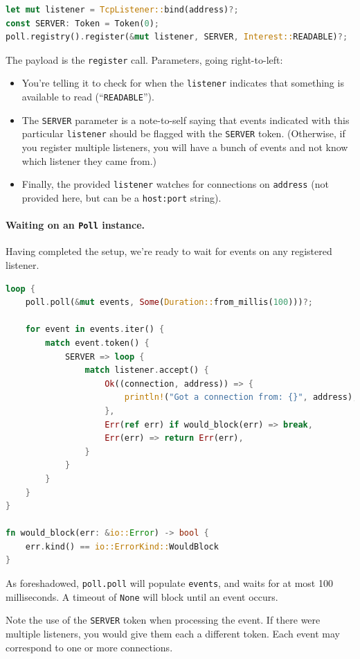 \begin{lstlisting}[language=Rust]
let mut listener = TcpListener::bind(address)?;
const SERVER: Token = Token(0);
poll.registry().register(&mut listener, SERVER, Interest::READABLE)?;
\end{lstlisting}

The payload is the \texttt{register} call. Parameters, going right-to-left:
\begin{itemize}[noitemsep]
\item You're telling it to check for 
when the \texttt{listener} indicates that something is available to read
(``\texttt{READABLE}'').
\item The \texttt{SERVER} parameter
is a note-to-self saying that events indicated with this particular
\texttt{listener} should be flagged with the \texttt{SERVER} token.
(Otherwise, if you register multiple listeners, you will have a bunch
of events and not know which listener they came from.)
\item Finally, the provided
\texttt{listener} watches for connections on \texttt{address} (not provided here,
but can be a \texttt{host:port} string).
\end{itemize}

\paragraph{Waiting on an {\tt Poll} instance.} Having completed
the setup, we're ready to wait for events on any registered listener.
    \begin{lstlisting}[language=Rust]
loop {
    poll.poll(&mut events, Some(Duration::from_millis(100)))?;

    for event in events.iter() {
        match event.token() {
            SERVER => loop {
                match listener.accept() {
                    Ok((connection, address)) => {
                        println!("Got a connection from: {}", address);
                    },
                    Err(ref err) if would_block(err) => break,
                    Err(err) => return Err(err),
                }
            }
        }
    }
}

fn would_block(err: &io::Error) -> bool {
    err.kind() == io::ErrorKind::WouldBlock
}    \end{lstlisting}
As foreshadowed, \texttt{poll.poll} will populate \texttt{events}, and
waits for at most 100 milliseconds. A timeout of \texttt{None} will block
until an event occurs.

Note the use of the \texttt{SERVER} token when processing the event.
If there were multiple listeners, you would give them each a different
token. Each event may correspond to one or more connections.

